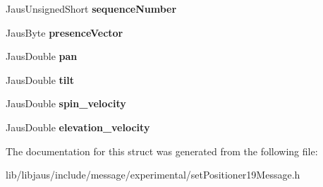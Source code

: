 \begin{DoxyCompactItemize}
\item 
\hypertarget{struct_set_positioner19_message_struct_a4ac86ebbea39c3e7bb78788bd2f8710d}{\-Jaus\-Unsigned\-Short {\bfseries sequence\-Number}}\label{struct_set_positioner19_message_struct_a4ac86ebbea39c3e7bb78788bd2f8710d}

\item 
\hypertarget{struct_set_positioner19_message_struct_ab577c5362a29da2089216f05bc8d0e4e}{\-Jaus\-Byte {\bfseries presence\-Vector}}\label{struct_set_positioner19_message_struct_ab577c5362a29da2089216f05bc8d0e4e}

\item 
\hypertarget{struct_set_positioner19_message_struct_a51c1d80c183c28e8f2b925220110c742}{\-Jaus\-Double {\bfseries pan}}\label{struct_set_positioner19_message_struct_a51c1d80c183c28e8f2b925220110c742}

\item 
\hypertarget{struct_set_positioner19_message_struct_aba261231f4b5be2c75686b85c3761689}{\-Jaus\-Double {\bfseries tilt}}\label{struct_set_positioner19_message_struct_aba261231f4b5be2c75686b85c3761689}

\item 
\hypertarget{struct_set_positioner19_message_struct_ac127267bdf3666783c0fc5c043822b5c}{\-Jaus\-Double {\bfseries spin\-\_\-velocity}}\label{struct_set_positioner19_message_struct_ac127267bdf3666783c0fc5c043822b5c}

\item 
\hypertarget{struct_set_positioner19_message_struct_a9778ce642ed5f28424632b5387a2b14e}{\-Jaus\-Double {\bfseries elevation\-\_\-velocity}}\label{struct_set_positioner19_message_struct_a9778ce642ed5f28424632b5387a2b14e}

\end{DoxyCompactItemize}


\-The documentation for this struct was generated from the following file\-:\begin{DoxyCompactItemize}
\item 
lib/libjaus/include/message/experimental/set\-Positioner19\-Message.\-h\end{DoxyCompactItemize}
